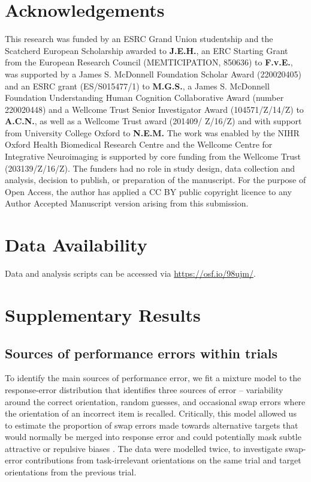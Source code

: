 \documentclass{article}
\begin{document}
\section*{Acknowledgements}
This research was funded by an ESRC Grand Union studentship and the Scatcherd European Scholarship awarded to \textbf{J.E.H.}, an ERC Starting Grant from the European Research Council (MEMTICIPATION, 850636) to \textbf{F.v.E.}, was supported by a James S. McDonnell Foundation Scholar Award (220020405) and an ESRC grant (ES/S015477/1) to \textbf{M.G.S.}, a James S. McDonnell Foundation Understanding Human Cognition Collaborative Award (number 220020448) and a Wellcome Trust Senior Investigator Award (104571/Z/14/Z) to \textbf{A.C.N.}, as well as a Wellcome Trust award (201409/ Z/16/Z) and with support from University College Oxford to \textbf{N.E.M.} The work was enabled by the NIHR Oxford Health Biomedical Research Centre and the Wellcome Centre for Integrative Neuroimaging is supported by core funding from the Wellcome Trust (203139/Z/16/Z). The funders had no role in study design, data collection and analysis, decision to publish, or preparation of the manuscript. For the purpose of Open Access, the author has applied a CC BY public copyright licence to any Author Accepted Manuscript version arising from this submission.

\section*{Data Availability}
Data and analysis scripts can be accessed via \href{https://osf.io/98ujm/}{https://osf.io/98ujm/}. 

\printbibliography

\section*{Supplementary Results}
\subsection*{Sources of performance errors within trials}
To identify the main sources of performance error, we fit a mixture model to the response-error distribution \parencite{Bays2009} that identifies three sources of error – variability around the correct orientation, random guesses, and occasional swap errors where the orientation of an incorrect item is recalled. Critically, this model allowed us to estimate the proportion of swap errors made towards alternative targets that would normally be merged into response error and could potentially mask subtle attractive or repulsive biases \parencite{Huang2020}. The data were modelled twice, to investigate swap-error contributions from task-irrelevant orientations on the same trial and target orientations from the previous trial.
\end{document}
